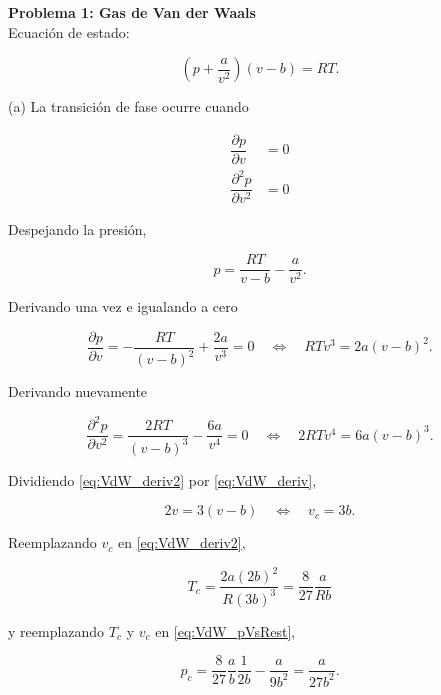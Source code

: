 \documentclass[10pt]{article}
\begin{document}
\textbf{Problema 1: Gas de Van der Waals}
\\

Ecuaci\'on de estado:

\begin{equation}
\left(p+\dfrac{a}{v^2}\right)\left( v-b\right)= RT.
\end{equation}

(a) La transici\'on de fase ocurre cuando 

\begin{align}
\dfrac{\partial p}{\partial v} &= 0\\
\dfrac{\partial^2 p}{\partial v^2} &= 0
\end{align}

Despejando la presi\'on,

\begin{equation} \label{eq:VdW_pVsRest}
p = \dfrac{RT}{v-b} - \dfrac{a}{v^2}.
\end{equation}

Derivando una vez e igualando a cero

\begin{equation} \label{eq:VdW_deriv}
\dfrac{\partial p}{\partial v} = -\dfrac{RT}{(v-b)^2}+ \dfrac{2a}{v^3} = 0\quad \Leftrightarrow \quad RTv^3 = 2a(v-b)^2.
\end{equation}

Derivando nuevamente

\begin{equation} \label{eq:VdW_deriv2}
\dfrac{\partial^2 p}{\partial v^2} = \dfrac{2RT}{(v-b)^3} - \dfrac{6a}{v^4} = 0\quad \Leftrightarrow \quad 2RTv^4 = 6a(v-b)^3.
\end{equation}

Dividiendo \ref{eq:VdW_deriv2} por \ref{eq:VdW_deriv},

\begin{equation}
2v = 3(v-b)\quad \Leftrightarrow \quad v_c = 3b.
\end{equation}

Reemplazando $v_c$ en \ref{eq:VdW_deriv2},

\begin{equation}
T_c = \dfrac{2a (2b)^2}{R(3b)^3} = \dfrac{8}{27}\dfrac{a}{Rb}
\end{equation}

y reemplazando $T_c$ y $v_c$ en \ref{eq:VdW_pVsRest},

\begin{equation}
p_c = \dfrac{8}{27} \dfrac{a}{b} \dfrac{1}{2b} - \dfrac{a}{9b^2} = \dfrac{a}{27 b^2}.
\end{equation}
\end{document}
